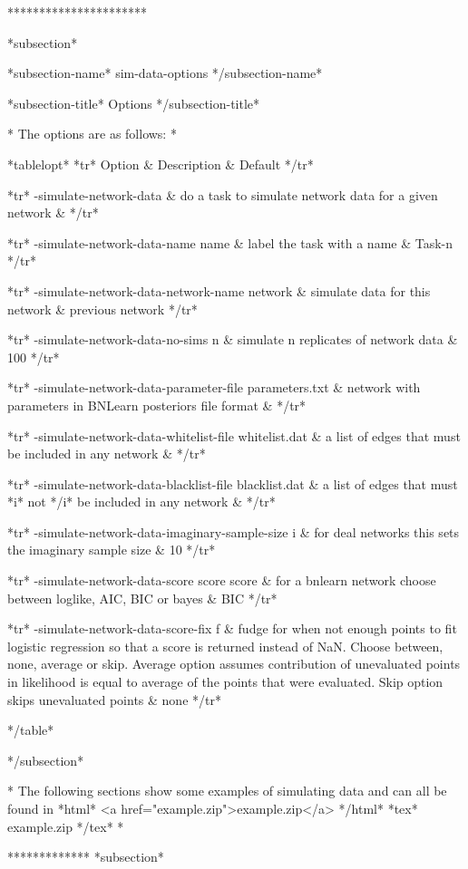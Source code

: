 **********************

*subsection*

*subsection-name* sim-data-options */subsection-name*

*subsection-title* Options */subsection-title*

* The options are as follows: *

*tablelopt* *tr* Option & Description & Default */tr*

*tr*
 -simulate-network-data  & do a task to simulate network data for a given network &
*/tr*

*tr*
  -simulate-network-data-name name & label the task with a name & Task-n
*/tr*

*tr*
  -simulate-network-data-network-name network & simulate data for this network & previous network
*/tr*

*tr*
  -simulate-network-data-no-sims n & simulate n replicates of network data & 100
*/tr*

*tr*
  -simulate-network-data-parameter-file parameters.txt & network with parameters in BNLearn posteriors file format &
*/tr*

*tr*
  -simulate-network-data-whitelist-file whitelist.dat & a list of edges that must be included in any network &
*/tr*

*tr*
  -simulate-network-data-blacklist-file blacklist.dat & a list of edges that must *i* not */i* be included in any network &
*/tr*

*tr*
  -simulate-network-data-imaginary-sample-size i & for deal networks this sets the imaginary sample size & 10
*/tr*

*tr*
  -simulate-network-data-score score score & for a bnlearn network choose between loglike, AIC, BIC or bayes & BIC
*/tr*

*tr*
  -simulate-network-data-score-fix f & fudge for when not enough points to fit logistic regression so that a score is returned instead of NaN. Choose between, none, average or skip. Average option assumes contribution of unevaluated points in likelihood is equal to average of the points that were evaluated. Skip option skips unevaluated points & none
*/tr*

*/table*

*/subsection*


* The following sections show some examples of simulating data and can all be found in *html* <a href="example.zip">example.zip</a> */html* *tex* example.zip */tex* *

************* *subsection*

